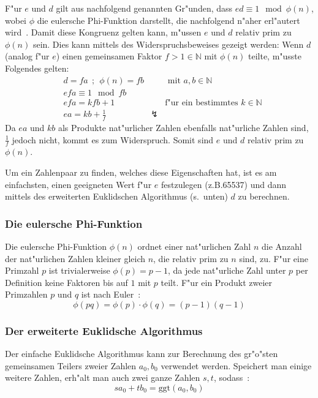 \documentclass[12pt]{article}
\begin{document}
F"ur $e$ und $d$ gilt aus nachfolgend genannten Gr"unden, dass $ed \equiv 1 \mod \phi(n)$,
wobei $\phi$ die eulersche Phi-Funktion darstellt, die nachfolgend n"aher erl"autert wird~\cite{rsa}.
Damit diese Kongruenz gelten kann, m"ussen $e$ und $d$ relativ prim zu $\phi(n)$ sein.
Dies kann mittels des Widerspruchsbeweises gezeigt werden:
Wenn $d$ (analog f"ur $e$) einen gemeinsamen Faktor $f > 1 \in \mathbb{N}$ mit $\phi(n)$ teilte, m"usste Folgendes gelten:
\[
\begin{aligned}
&d = fa ~~;~~ \phi(n) = fb && \textrm{ mit } a, b \in \mathbb{N} \\
&efa \equiv 1 \mod fb \\
&efa = kfb + 1 && \textrm{f"ur ein bestimmtes } k \in \mathbb{N} \\
&ea = kb + \frac{1}{f} & \lightning &
\end{aligned}
\]
Da $ea$ und $kb$ als Produkte nat"urlicher Zahlen ebenfalls nat"urliche Zahlen sind, $\frac{1}{f}$ jedoch nicht, kommt es zum Widerspruch.
Somit sind $e$ und $d$ relativ prim zu $\phi(n)$.

Um ein Zahlenpaar zu finden, welches diese Eigenschaften hat,
ist es am einfachsten, einen geeigneten Wert f"ur $e$ festzulegen (z.B.\@ 65537)
und dann mittels des erweiterten Euklidschen Algorithmus (s.~unten) $d$ zu berechnen.

\subsubsection{Die eulersche Phi-Funktion}
Die eulersche Phi-Funktion $\phi(n)$ ordnet einer nat"urlichen Zahl $n$ die Anzahl
der nat"urlichen Zahlen kleiner gleich $n$, die relativ prim zu $n$ sind, zu.
F"ur eine Primzahl $p$ ist trivialerweise $\phi(p) = p-1$,
da jede nat"urliche Zahl unter $p$ per Definition keine Faktoren bis auf $1$ mit $p$ teilt.
F"ur ein Produkt zweier Primzahlen $p$ und $q$ ist nach Euler~\cite{euler63}:
\begin{equation}\label{eq:phi_calc}\phi(pq) = \phi(p) \cdot \phi(q) = (p-1)(q-1)\end{equation}

\subsubsection{Der erweiterte Euklidsche Algorithmus}
Der einfache Euklidsche Algorithmus kann zur Berechnung des gr"o"sten gemeinsamen
Teilers zweier Zahlen $a_0, b_0$ verwendet werden.
Speichert man einige weitere Zahlen, erh"alt man auch zwei ganze Zahlen $s, t$, sodass~\cite{taocp2}:
\begin{equation}\label{eq:euclid} sa_0 + tb_0 = \textrm{ggt}(a_0, b_0) \end{equation}
\end{document}
